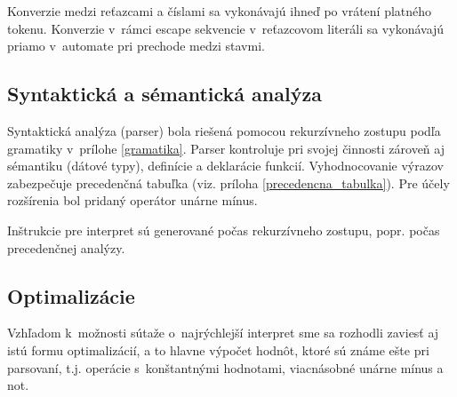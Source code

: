 \documentclass[12pt,a4paper,titlepage,final]{article}
\begin{document}
Konverzie medzi reťazcami a číslami sa vykonávajú ihneď po vrátení platného tokenu.
Konverzie v~rámci escape sekvencie v~reťazcovom literáli sa vykonávajú
 priamo v~automate pri prechode medzi stavmi.

\subsection{Syntaktická a sémantická analýza}
Syntaktická analýza (parser) bola riešená pomocou rekurzívneho zostupu 
 podľa gramatiky v~prílohe \ref{gramatika}.
Parser kontroluje pri svojej činnosti zároveň aj sémantiku (dátové typy),
definície a deklarácie funkcií.
Vyhodnocovanie výrazov zabezpečuje precedenčná tabuľka 
 (viz. príloha \ref{precedencna_tabulka}). Pre účely rozšírenia bol
 pridaný operátor unárne mínus.

Inštrukcie pre interpret sú generované počas rekurzívneho zostupu, popr. počas
precedenčnej analýzy.

     
     
     
     

\subsection{Optimalizácie}
Vzhľadom k~možnosti sútaže o~najrýchlejší interpret sme sa rozhodli zaviesť aj
istú formu optimalizácií, a to hlavne výpočet hodnôt, ktoré sú známe ešte pri
parsovaní, t.j. operácie s~konštantnými hodnotami, viacnásobné unárne mínus a not.
\end{document}
